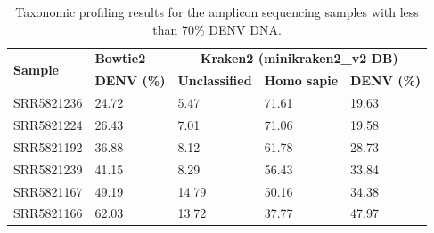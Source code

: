 \begin{longtable}{@{}lllll@{}}
\caption{Taxonomic profiling results for the amplicon sequencing samples with less than 70\% DENV DNA.}
\label{tab:chap4_s5}\\
\toprule
\multirow{2}{*}{\textbf{Sample}} & \textbf{Bowtie2}   & \multicolumn{3}{c}{\textbf{Kraken2 (minikraken2\_v2 DB)}}        \\* \cmidrule(l){2-5} 
                                 & \textbf{DENV (\%)} & \textbf{Unclassified} & \textbf{Homo sapie} & \textbf{DENV (\%)} \\* \midrule
SRR5821236 & 24.72 & 5.47  & 71.61 & 19.63 \\*
SRR5821224 & 26.43 & 7.01  & 71.06 & 19.58 \\* 
SRR5821192 & 36.88 & 8.12  & 61.78 & 28.73 \\* 
SRR5821239 & 41.15 & 8.29  & 56.43 & 33.84 \\* 
SRR5821167 & 49.19 & 14.79 & 50.16 & 34.38 \\* 
SRR5821166 & 62.03 & 13.72 & 37.77 & 47.97 \\* 
\end{longtable}

\newpage

